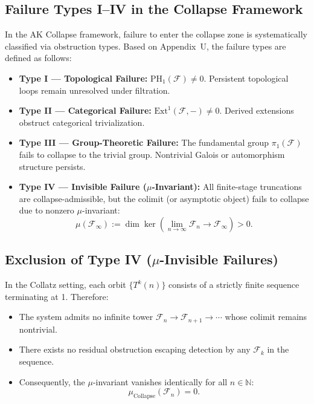 \documentclass[11pt]{article}
\begin{document}
\subsection{Failure Types I–IV in the Collapse Framework}

In the AK Collapse framework, failure to enter the collapse zone is systematically classified via obstruction types. Based on Appendix~U, the failure types are defined as follows:

\begin{itemize}
  \item \textbf{Type I — Topological Failure:}  
  \( \mathrm{PH}_1(\mathcal{F}) \neq 0 \). Persistent topological loops remain unresolved under filtration.
  
  \item \textbf{Type II — Categorical Failure:}  
  \( \mathrm{Ext}^1(\mathcal{F}, -) \neq 0 \). Derived extensions obstruct categorical trivialization.
  
  \item \textbf{Type III — Group-Theoretic Failure:}  
  The fundamental group \( \pi_1(\mathcal{F}) \) fails to collapse to the trivial group. Nontrivial Galois or automorphism structure persists.

  \item \textbf{Type IV — Invisible Failure (\( \mu \)-Invariant):}  
  All finite-stage truncations are collapse-admissible, but the colimit (or asymptotic object) fails to collapse due to nonzero \( \mu \)-invariant:
  \[
  \mu(\mathcal{F}_\infty) := \dim \ker\left( \lim_{n \to \infty} \mathcal{F}_n \to \mathcal{F}_\infty \right) > 0.
  \]
\end{itemize}

\subsection{Exclusion of Type IV (\texorpdfstring{\( \mu \)}{μ}-Invisible Failures)}

In the Collatz setting, each orbit \( \{T^k(n)\} \) consists of a strictly finite sequence terminating at 1. Therefore:

\begin{itemize}
  \item The system admits no infinite tower \( \mathcal{F}_n \to \mathcal{F}_{n+1} \to \cdots \) whose colimit remains nontrivial.
  \item There exists no residual obstruction escaping detection by any \( \mathcal{F}_k \) in the sequence.
  \item Consequently, the \( \mu \)-invariant vanishes identically for all \( n \in \mathbb{N} \):
  \[
  \mu_{\mathrm{Collapse}}(\mathcal{F}_n) = 0.
  \]
\end{itemize}
\end{document}
